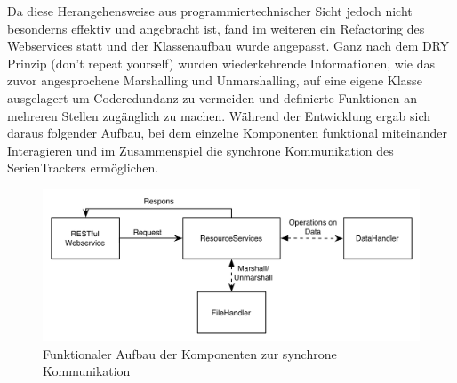 Da diese Herangehensweise aus programmiertechnischer Sicht jedoch nicht besonderns effektiv und angebracht ist, fand im weiteren ein Refactoring des Webservices statt und der Klassenaufbau wurde angepasst. Ganz nach dem DRY Prinzip (don't repeat yourself) wurden wiederkehrende Informationen, wie das zuvor angesprochene Marshalling und Unmarshalling, auf eine eigene Klasse ausgelagert um Coderedundanz zu vermeiden und definierte Funktionen an mehreren Stellen zugänglich zu machen. Während der Entwicklung ergab sich daraus folgender Aufbau, bei dem einzelne Komponenten funktional miteinander Interagieren und im Zusammenspiel die synchrone Kommunikation des SerienTrackers ermöglichen.
\begin{figure}[h!]
\includegraphics[width=1\textwidth]{../images/aufbaurest.png}
\caption{Funktionaler Aufbau der Komponenten zur synchrone Kommunikation }
\label{RESTaufbau}
\end{figure}

